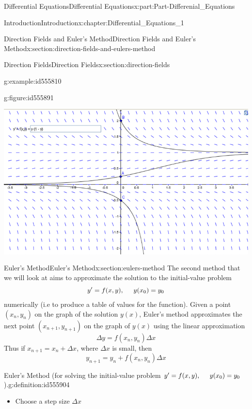 \documentclass[oneside,10pt,]{book}
\newcommand{\terminology}[1]{\textbf{#1}}
\numberwithin{equation}{section}
\begin{document}
\begin{partptx}{Differential Equations}{}{Differential Equations}{}{}{x:part:Part-Differenial_Equations}
\begin{chapterptx}{Introduction}{}{Introduction}{}{}{x:chapter:Differential_Equations_1}
\begin{sectionptx}{Direction Fields and Euler's Method}{}{Direction Fields and Euler's Method}{}{}{x:section:direction-fields-and-eulers-method}
\begin{sectionptx}{Direction Fields}{}{Direction Fields}{}{}{x:section:direction-fields}
\begin{example}{}{g:example:id555810}
\begin{figureptx}{}{g:figure:id555891}{}
\begin{image}{0.125}{0.75}{0.125}
\includegraphics[width=\linewidth]{./DifferentialEquations/Images/1/2_example9.png}
\end{image}%
\tcblower
\end{figureptx}%
\end{example}
\end{sectionptx}
%
%
\typeout{************************************************}
\typeout{************************************************}
%
\begin{sectionptx}{Euler's Method}{}{Euler's Method}{}{}{x:section:eulers-method}
The second method that we will look at aims to approximate the solution to the initial-value problem%
\begin{equation*}
y'=f(x,y), \hspace{5mm} y(x_0)=y_0
\end{equation*}
numerically (i.e to produce a table of values for the function). Given a point \((x_n,y_n)\) on the graph of the solution \(y(x)\), Euler’s method approximates the next point \((x_{n+1},y_{n+1})\) on the graph of \(y(x)\) using the linear approximation%
\begin{equation*}
\Delta y=f(x_n,y_n)\Delta x
\end{equation*}
Thus if \(x_{n+1}=x_n+\Delta x\), where \(\Delta x\) is small, then%
\begin{equation*}
y_{n+1}=y_n+f(x_n,y_n)\Delta x
\end{equation*}
%
\begin{definition}{Euler's Method (for solving the initial-value problem \(y'=f(x,y), \hspace{5mm} y(x_0)=y_0\)).}{g:definition:id555904}%
%
\begin{itemize}[label=\textbullet]
\item{}Choose a step size \terminology{\(\Delta x\)}%

\end{itemize}
\end{definition}
\end{sectionptx}
\end{sectionptx}
\end{chapterptx}
\end{partptx}
\end{document}
